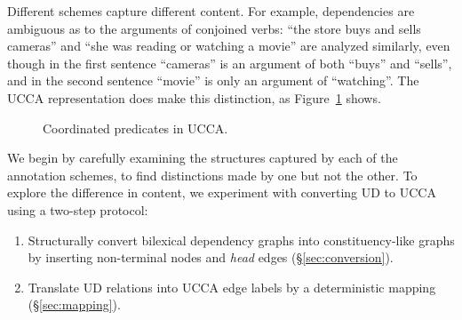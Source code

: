 \documentclass[11pt,a4paper]{article}
\begin{document}
Different schemes capture different content.
For example, dependencies are ambiguous as to the arguments of conjoined verbs:
``the store buys and sells cameras'' and ``she was reading or watching a movie''
are analyzed similarly, even though in the first sentence ``cameras'' is an argument
of both ``buys'' and ``sells'', and in the second sentence ``movie'' is only an argument
of ``watching''.
The UCCA representation does make this distinction, as Figure~\ref{fig:conjoined_verbs} shows.

\begin{figure}[!ht]
  \centering
\caption{Coordinated predicates in UCCA.
\label{fig:conjoined_verbs}}
\end{figure}

We begin by carefully examining the structures captured by each of the annotation schemes,
to find distinctions made by one but not the other.
To explore the difference in content, we experiment with converting UD to UCCA
using a two-step protocol:
\begin{enumerate}
\item Structurally convert bilexical dependency graphs into constituency-like graphs by inserting
  non-terminal nodes and \textit{head} edges (\S\ref{sec:conversion}).
\item Translate UD relations into UCCA edge labels
  by a deterministic mapping (\S\ref{sec:mapping}).
\end{enumerate}
\end{document}
